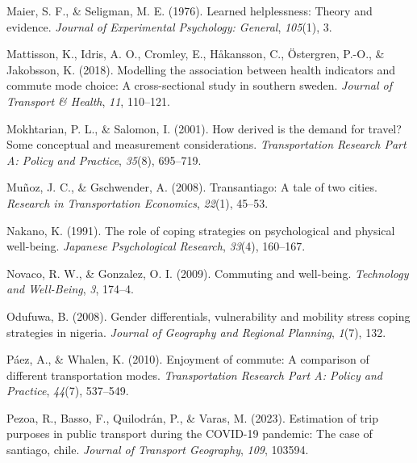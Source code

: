 \documentclass[
11pt, %
oneside, %
english, %
singlespacing, %
]{macthesis} %
\newlength{\cslhangindent}
\newenvironment{CSLReferences}[2] %
 {%
  \setlength{\parindent}{0pt}
  \ifodd #1 \everypar{\setlength{\hangindent}{\cslhangindent}}\ignorespaces\fi
  \ifnum #2 > 0
  \setlength{\parskip}{#2\baselineskip}
  \fi
 }%
 {}
\begin{document}
\begin{CSLReferences}{1}{0}
\leavevmode{}%
Maier, S. F., \& Seligman, M. E. (1976). Learned helplessness: Theory and evidence. \emph{Journal of Experimental Psychology: General}, \emph{105}(1), 3.

\leavevmode{}%
Mattisson, K., Idris, A. O., Cromley, E., Håkansson, C., Östergren, P.-O., \& Jakobsson, K. (2018). Modelling the association between health indicators and commute mode choice: A cross-sectional study in southern sweden. \emph{Journal of Transport \& Health}, \emph{11}, 110--121.

\leavevmode{}%
Mokhtarian, P. L., \& Salomon, I. (2001). How derived is the demand for travel? Some conceptual and measurement considerations. \emph{Transportation Research Part A: Policy and Practice}, \emph{35}(8), 695--719.

\leavevmode{}%
Muñoz, J. C., \& Gschwender, A. (2008). Transantiago: A tale of two cities. \emph{Research in Transportation Economics}, \emph{22}(1), 45--53.

\leavevmode{}%
Nakano, K. (1991). The role of coping strategies on psychological and physical well-being. \emph{Japanese Psychological Research}, \emph{33}(4), 160--167.

\leavevmode{}%
Novaco, R. W., \& Gonzalez, O. I. (2009). Commuting and well-being. \emph{Technology and Well-Being}, \emph{3}, 174--4.

\leavevmode{}%
Odufuwa, B. (2008). Gender differentials, vulnerability and mobility stress coping strategies in nigeria. \emph{Journal of Geography and Regional Planning}, \emph{1}(7), 132.

\leavevmode{}%
Páez, A., \& Whalen, K. (2010). Enjoyment of commute: A comparison of different transportation modes. \emph{Transportation Research Part A: Policy and Practice}, \emph{44}(7), 537--549.

\leavevmode{}%
Pezoa, R., Basso, F., Quilodrán, P., \& Varas, M. (2023). Estimation of trip purposes in public transport during the COVID-19 pandemic: The case of santiago, chile. \emph{Journal of Transport Geography}, \emph{109}, 103594.


\end{CSLReferences}
\end{document}
